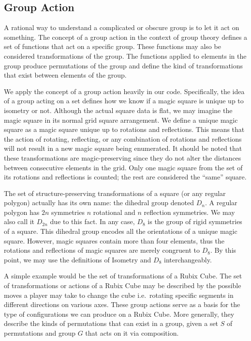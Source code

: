 \documentclass{rhumj_new}
\begin{document}
\subsection{Group Action}

A rational way to understand a complicated or obscure group is to let it act on something. The
concept of a group action in the context of group theory defines a set of functions that act on a
specific group. These functions may also be considered transformations of the group. The functions
applied to elements in the group produce permutations of the group and define the kind of
transformations that exist between elements of the group.


We apply the concept of a group action heavily in our code. Specifically, the idea of a group
acting on a set defines how we know if a magic square is unique up to isometry or not. Although the
actual square data is flat, we may imagine the magic square in its normal grid square arrangement.
We define a unique magic square as a magic square unique up to rotations and reflections. This
means that the action of rotating, reflecting, or any combination of rotations and reflections will
not result in a new magic square being enumerated. It should be noted that these transformations
are magic-preserving since they do not alter the distances between consecutive elements in the
grid. Only one magic square from the set of its rotations and reflections is counted; the rest are
considered the ``same'' square.

The set of structure-preserving transformations of a square (or any regular polygon) actually
has its own name: the dihedral group denoted $D_n$. A regular polygon has $2n$ symmetries
\textemdash{}
$n$ rotational and $n$ reflection symmetries. We may also call it $D_{2n}$ due to this fact. In any
case, $D_8$ is the group of rigid symmetries of a square. This dihedral group encodes all the
orientations of a unique magic square. However, magic squares contain more than four elements, thus
the rotations and reflections of magic squares are merely congruent to $D_8$. By this point, we may
use the definitions of Isometry and $D_8$ interchangeably.

A simple example would be the set of transformations of a Rubix Cube. The set of transformations or
actions of a Rubix Cube may be described by the possible moves a player may take to change the cube
i.e.\ rotating specific segments in different directions on various axes. These group actions serve
as a basis for the type of configurations we can produce on a Rubix Cube. More generally, they
describe the kinds of permutations that can exist in a group, given a set $S$ of permutations and
group $G$ that acts on it via composition.
\end{document}
